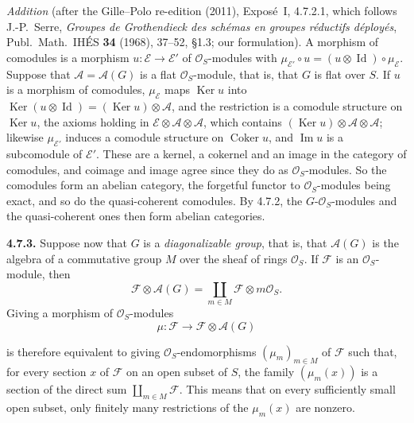 \par\medskip\noindent
\emph{Addition} (after the Gille--Polo re-edition (2011), Exposé~I, 4.7.2.1,
which follows J.-P.~Serre, \textit{Groupes de Grothendieck des schémas en
groupes réductifs déployés}, Publ.\ Math.\ IHÉS \textbf{34} (1968), 37--52,
\S1.3; our formulation). A morphism of comodules is a morphism
\(u:\mathscr E\to\mathscr E'\) of \(\mathcal O_S\)-modules with
\(\mu_{\mathscr E'}\circ u=(u\otimes\operatorname{Id})\circ\mu_{\mathscr E}\).
Suppose that \(\mathscr A=\mathscr A(G)\) is a flat \(\mathcal O_S\)-module,
that is, that \(G\) is flat over \(S\). If \(u\) is a morphism of
comodules, \(\mu_{\mathscr E}\) maps \(\operatorname{Ker}u\) into
\(\operatorname{Ker}(u\otimes\operatorname{Id})=(\operatorname{Ker}u)\otimes\mathscr A\),
and the restriction is a comodule structure on \(\operatorname{Ker}u\), the
axioms holding in \(\mathscr E\otimes\mathscr A\otimes\mathscr A\), which
contains \((\operatorname{Ker}u)\otimes\mathscr A\otimes\mathscr A\);
likewise \(\mu_{\mathscr E'}\) induces a comodule structure on
\(\operatorname{Coker}u\), and \(\operatorname{Im}u\) is a subcomodule of
\(\mathscr E'\). These are a kernel, a cokernel and an image in the category
of comodules, and coimage and image agree since they do as
\(\mathcal O_S\)-modules. So the comodules form an abelian category, the
forgetful functor to \(\mathcal O_S\)-modules being exact, and so do the
quasi-coherent comodules. By 4.7.2, the \(G\)-\(\mathcal O_S\)-modules and
the quasi-coherent ones then form abelian categories.
\par\medskip

\medskip
\noindent{}\textbf{4.7.3.}
Suppose now that \(G\) is a \emph{diagonalizable group}, that is, that
\(\mathscr A(G)\) is the algebra of a commutative group \(M\) over the
sheaf of rings \(\mathcal O_S\). If \(\mathscr F\) is an
\(\mathcal O_S\)-module, then
\[
  \mathscr F\otimes\mathscr A(G)
    =\coprod_{m\in M}\mathscr F\otimes m\mathcal O_S.
\]
Giving a morphism of \(\mathcal O_S\)-modules
\[
  \mu:\mathscr F\longrightarrow\mathscr F\otimes\mathscr A(G)
\]

is therefore equivalent to giving \(\mathcal O_S\)-endomorphisms
\((\mu_m)_{m\in M}\) of \(\mathscr F\) such that, for every section
\(x\) of \(\mathscr F\) on an open subset of \(S\), the family
\((\mu_m(x))\) is a section of the direct sum
\(\coprod_{m\in M}\mathscr F\). This means that on every sufficiently
small open subset, only finitely many restrictions of the
\(\mu_m(x)\) are nonzero.

